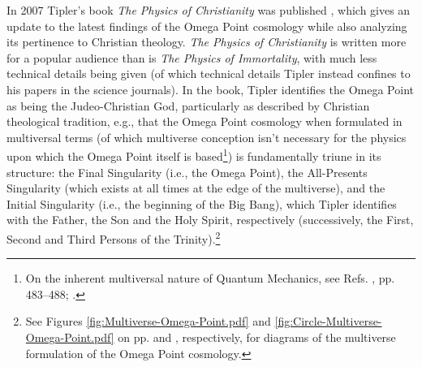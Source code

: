 \documentclass[letterpaper,12pt]{article}
\begin{document}
In 2007 Tipler's book \emph{The Physics of Christianity} was published \cite{Tipler2007}, which gives an update to the latest findings of the Omega Point cosmology while also analyzing its pertinence to Christian theology. \emph{The Physics of Christianity} is written more for a popular audience than is \emph{The Physics of Immortality}, with much less technical details being given (of which technical details Tipler instead confines to his papers in the science journals). In the book, Tipler identifies the Omega Point as being the Judeo-Christian God, particularly as described by Christian theological tradition, e.g., that the Omega Point cosmology when formulated in multiversal terms (of which multiverse conception isn't necessary for the physics upon which the Omega Point itself is based\footnote{On the inherent multiversal nature of Quantum Mechanics, see Refs. , pp. 483--488; .}) is fundamentally triune in its structure: the Final Singularity (i.e., the Omega Point), the All-Presents Singularity (which exists at all times at the edge of the multiverse), and the Initial Singularity (i.e., the beginning of the Big Bang), which Tipler identifies with the Father, the Son and the Holy Spirit, respectively (successively, the First, Second and Third Persons of the Trinity).\footnote{See Figures \ref{fig:Multiverse-Omega-Point.pdf} and \ref{fig:Circle-Multiverse-Omega-Point.pdf} on pp. \pageref{fig:Multiverse-Omega-Point.pdf} and \pageref{fig:Circle-Multiverse-Omega-Point.pdf}, respectively, for diagrams of the multiverse formulation of the Omega Point cosmology.}

\end{document}
